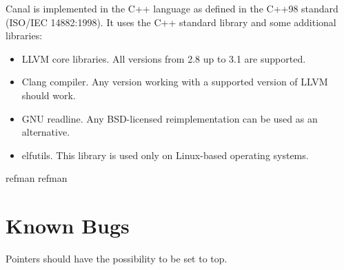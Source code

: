 \documentclass[a4paper]{book}
\begin{document}
Canal is implemented in the C++ language as defined in the C++98
standard (ISO/IEC 14882:1998).  It uses the C++ standard library and
some additional libraries:
\begin{itemize}
\item LLVM core libraries.  All versions from 2.8 up to 3.1 are
  supported.
\item Clang compiler.  Any version working with a supported version of
  LLVM should work.
\item GNU readline.  Any BSD-licensed reimplementation can be used as
  an alternative.
\item elfutils.  This library is used only on Linux-based operating
  systems.
\end{itemize}

{refman}
{refman}

\chapter{Known Bugs}
Pointers should have the possibility to be set to top.
\end{document}
